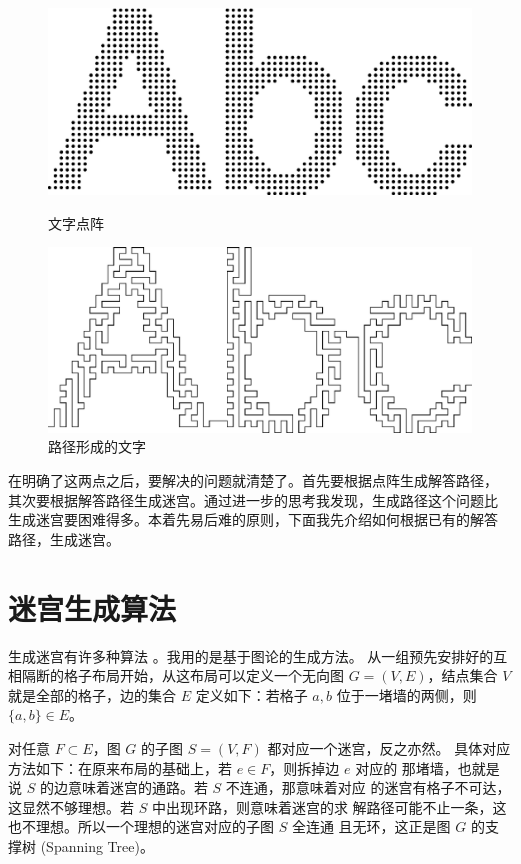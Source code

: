 \documentclass[cs4size,a4paper,adobefonts]{ctexart}
\begin{document}
\begin{figure}[htbp]
  \centering
  \begin{minipage}{0.5\textwidth}
    \centering
    \includegraphics[width=0.95\linewidth]{abcGrid}
    \caption{文字点阵}\label{fig:abcGrid}
  \end{minipage}%
  \begin{minipage}{0.5\textwidth}
    \centering
    \includegraphics[width=0.95\linewidth]{abcPath}
    \caption{路径形成的文字}\label{fig:abcPath}
  \end{minipage}
\end{figure}

在明确了这两点之后，要解决的问题就清楚了。首先要根据点阵生成解答路径，
其次要根据解答路径生成迷宫。通过进一步的思考我发现，生成路径这个问题比
生成迷宫要困难得多。本着先易后难的原则，下面我先介绍如何根据已有的解答
路径，生成迷宫。

\section{迷宫生成算法}
生成迷宫有许多种算法 \cite{wiki:mazeGen}。我用的是基于图论的生成方法。
从一组预先安排好的互相隔断的格子布局开始，从这布局可以定义一个无向图
$G=(V,E)$，结点集合 $V$ 就是全部的格子，边的集合 $E$ 定义如下：若格子
$a,b$ 位于一堵墙的两侧，则 $\{a,b\}\in E$。

对任意 $F\subset E$，图 $G$ 的子图 $S=(V,F)$ 都对应一个迷宫，反之亦然。
具体对应方法如下：在原来布局的基础上，若 $e\in F$，则拆掉边 $e$ 对应的
那堵墙，也就是说 $S$ 的边意味着迷宫的通路。若 $S$ 不连通，那意味着对应
的迷宫有格子不可达，这显然不够理想。若 $S$ 中出现环路，则意味着迷宫的求
解路径可能不止一条，这也不理想。所以一个理想的迷宫对应的子图 $S$ 全连通
且无环，这正是图 $G$ 的支撑树 (Spanning Tree)。
\end{document}
